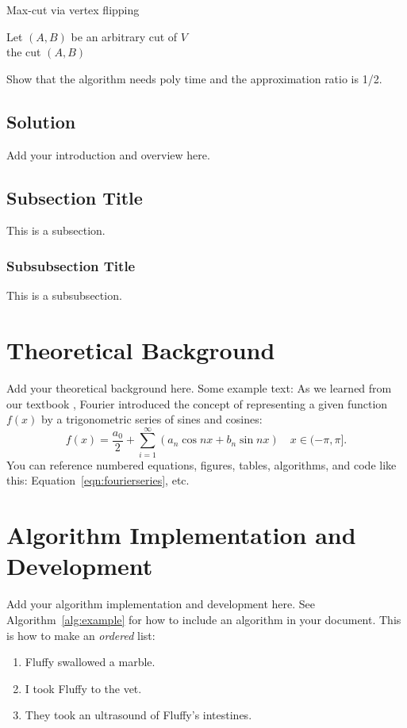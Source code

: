 \documentclass{article}
\begin{document}
\begin{algorithm}
\caption{Max-cut via vertex flipping}
 Let $(A,B)$ be an arbitrary cut of $V$\\
 \Return the cut $(A,B)$
\end{algorithm}

Show that the algorithm needs poly time and the approximation ratio is 1/2.
\subsection{Solution}
Add your introduction and overview here.

\subsection{Subsection Title}
This is a subsection.

\subsubsection{Subsubsection Title}
This is a subsubsection.

\section{Theoretical Background}
Add your theoretical background here. Some example text: As we learned from our textbook \cite{kutz_2013}, Fourier introduced the concept of representing a given function $f(x)$ by a trigonometric series of sines and cosines:
\begin{equation}
    f(x) = \frac{a_0}{2} + \sum_{i=1}^\infty \left(a_n\cos{nx} + b_n\sin{nx}\right) \quad x \in (-\pi,\pi].
    \label{eqn:fourierseries}
\end{equation}
You can reference numbered equations, figures, tables, algorithms, and code like this: Equation~\ref{eqn:fourierseries}, etc.

\section{Algorithm Implementation and Development}
Add your algorithm implementation and development here. See Algorithm~\ref{alg:example} for how to include an algorithm in your document. This is how to make an \textit{ordered} list:
\begin{enumerate}
    \item Fluffy swallowed a marble.
    \item I took Fluffy to the vet.
    \item They took an ultrasound of Fluffy's intestines.
\end{enumerate}
\end{document}
